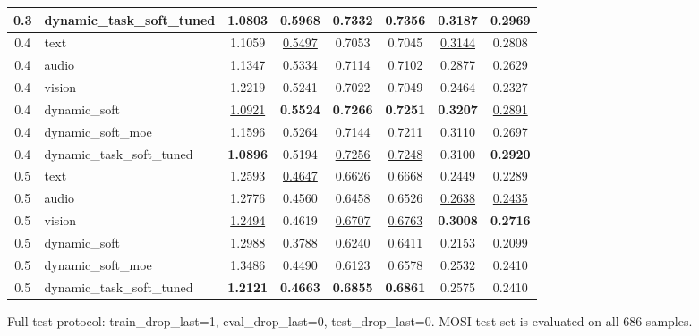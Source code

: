 \begin{table}[t]
\begin{tabular}{c l c c c c c c}
0.3 & dynamic_task_soft_tuned & 1.0803 & 0.5968 & 0.7332 & 0.7356 & 0.3187 & 0.2969 \\
\midrule
0.4 & text & 1.1059 & \underline{0.5497} & 0.7053 & 0.7045 & \underline{0.3144} & 0.2808 \\
0.4 & audio & 1.1347 & 0.5334 & 0.7114 & 0.7102 & 0.2877 & 0.2629 \\
0.4 & vision & 1.2219 & 0.5241 & 0.7022 & 0.7049 & 0.2464 & 0.2327 \\
0.4 & dynamic_soft & \underline{1.0921} & \textbf{0.5524} & \textbf{0.7266} & \textbf{0.7251} & \textbf{0.3207} & \underline{0.2891} \\
0.4 & dynamic_soft_moe & 1.1596 & 0.5264 & 0.7144 & 0.7211 & 0.3110 & 0.2697 \\
0.4 & dynamic_task_soft_tuned & \textbf{1.0896} & 0.5194 & \underline{0.7256} & \underline{0.7248} & 0.3100 & \textbf{0.2920} \\
\midrule
0.5 & text & 1.2593 & \underline{0.4647} & 0.6626 & 0.6668 & 0.2449 & 0.2289 \\
0.5 & audio & 1.2776 & 0.4560 & 0.6458 & 0.6526 & \underline{0.2638} & \underline{0.2435} \\
0.5 & vision & \underline{1.2494} & 0.4619 & \underline{0.6707} & \underline{0.6763} & \textbf{0.3008} & \textbf{0.2716} \\
0.5 & dynamic_soft & 1.2988 & 0.3788 & 0.6240 & 0.6411 & 0.2153 & 0.2099 \\
0.5 & dynamic_soft_moe & 1.3486 & 0.4490 & 0.6123 & 0.6578 & 0.2532 & 0.2410 \\
0.5 & dynamic_task_soft_tuned & \textbf{1.2121} & \textbf{0.4663} & \textbf{0.6855} & \textbf{0.6861} & 0.2575 & 0.2410 \\
\midrule
\bottomrule
\end{tabular}
\vspace{2mm}
\footnotesize Full-test protocol: train\_drop\_last=1, eval\_drop\_last=0, test\_drop\_last=0. MOSI test set is evaluated on all 686 samples.
\end{table}